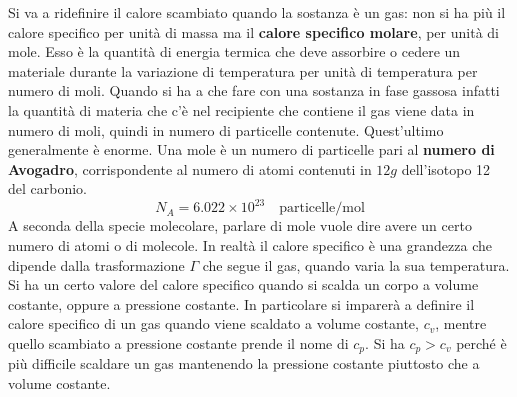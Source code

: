 \documentclass[10pt,a4paper]{book}
\begin{document}
Si va a ridefinire il calore scambiato quando la sostanza è un gas: non si ha più il calore specifico per unità di massa ma il \textbf{calore specifico molare}, per unità di mole. Esso è la quantità di energia termica che deve assorbire o cedere un materiale durante la variazione di temperatura per unità di temperatura per numero di moli. Quando si ha a che fare con una sostanza in fase gassosa infatti la quantità di materia che c'è nel recipiente che contiene il gas viene data in numero di moli, quindi in numero di particelle contenute. Quest'ultimo generalmente è enorme. Una mole è un numero di particelle pari al \textbf{numero di Avogadro}, corrispondente al numero di atomi contenuti in $12 g$ dell'isotopo 12 del carbonio.
\[
	N_A = 6.022 \times 10^{23} \quad \text{particelle/mol}
\]
A seconda della specie molecolare, parlare di mole vuole dire avere un certo numero di atomi o di molecole.
In realtà il calore specifico è una grandezza che dipende dalla trasformazione $\Gamma$ che segue il gas, quando varia la sua temperatura. Si ha un certo valore del calore specifico quando si scalda un corpo a volume costante, oppure a pressione costante. In particolare si imparerà a definire il calore specifico di un gas quando viene scaldato a volume costante, $c_v$, mentre quello scambiato a pressione costante prende il nome di $c_p$. Si ha $c_p > c_v$ perché è più difficile scaldare un gas mantenendo la pressione costante piuttosto che a volume costante.
\end{document}
